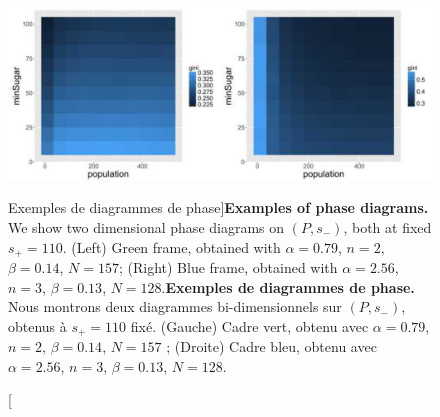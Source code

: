 

\begin{figure}
\includegraphics[width=\linewidth]{Figures/Final/3-1-3-fig-computation-sugarscape-phasediagrams.jpg}
\caption[Examples of phase diagrams][Exemples de diagrammes de phase]{\textbf{Examples of phase diagrams.} We show two dimensional phase diagrams on $(P,s_-)$, both at fixed $s_+ = 110$. (Left) Green frame, obtained with $\alpha = 0.79$, $n=2$, $\beta = 0.14$, $N=157$; (Right) Blue frame, obtained with $\alpha = 2.56$, $n=3$, $\beta = 0.13$, $N=128$.\label{fig:computation:sugarscape-phasediagrams}}{\textbf{Exemples de diagrammes de phase.} Nous montrons deux diagrammes bi-dimensionnels sur $(P,s_-)$, obtenus à $s_+ = 110$ fixé. (Gauche) Cadre vert, obtenu avec $\alpha = 0.79$, $n=2$, $\beta = 0.14$, $N=157$ ; (Droite) Cadre bleu, obtenu avec $\alpha = 2.56$, $n=3$, $\beta = 0.13$, $N=128$.\label{fig:computation:sugarscape-phasediagrams}}
\end{figure}


